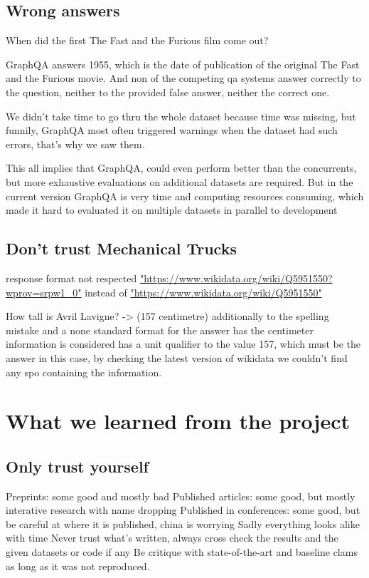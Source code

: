 \subsection{Wrong answers}
When did the first The Fast and the Furious film come out?

GraphQA answers 1955, which is the date of publication of the original The Fast and the Furious movie. And non of the competing qa systems answer correctly to the question, neither to the provided false answer, neither the correct one.

We didn't take time to go thru the whole dataset because time was missing, but funnily, GraphQA most often triggered warnings when the dataset had such errors, that's why we saw them.

This all implies that GraphQA, could even perform better than the concurrents, but more exhaustive evaluations on additional datasets are required. But in the current version GraphQA is very time and computing resources consuming, which made it hard to evaluated it on multiple datasets in parallel to development 


\subsection{Don't trust Mechanical Trucks}
response format not respected \url{"https://www.wikidata.org/wiki/Q5951550?wprov=srpw1\_0"} instead of \url{"https://www.wikidata.org/wiki/Q5951550"}

How tall is Avril Lavigne? -> (157 centimetre) additionally to the spelling mistake and a none standard format for the answer has the centimeter information is considered has a unit qualifier to the value 157, which must be the answer in this case, by checking the latest version of wikidata we couldn't find any spo containing the information.


\section{What we learned from the project}
\subsection{Only trust yourself}
Preprints: some good and mostly bad
Published articles: some good, but mostly interative research with name dropping
Published in conferences: some good, but be careful at where it is published, china is worrying
Sadly everything looks alike with time
Never trust what's written, always cross check the results and the given datasets or code if any
Be critique with state-of-the-art and baseline clams as long as it was not reproduced.



